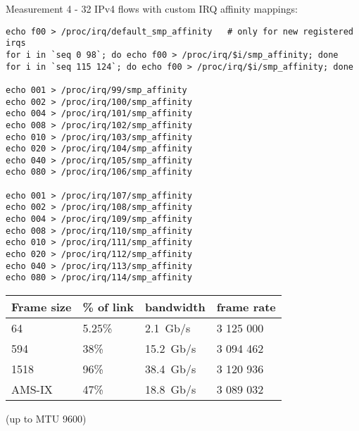 Measurement 4 - 32 IPv4 flows with custom IRQ affinity mappings:
\begin{lstlisting}
echo f00 > /proc/irq/default_smp_affinity   # only for new registered irqs
for i in `seq 0 98`; do echo f00 > /proc/irq/$i/smp_affinity; done
for i in `seq 115 124`; do echo f00 > /proc/irq/$i/smp_affinity; done

echo 001 > /proc/irq/99/smp_affinity
echo 002 > /proc/irq/100/smp_affinity
echo 004 > /proc/irq/101/smp_affinity
echo 008 > /proc/irq/102/smp_affinity
echo 010 > /proc/irq/103/smp_affinity
echo 020 > /proc/irq/104/smp_affinity
echo 040 > /proc/irq/105/smp_affinity
echo 080 > /proc/irq/106/smp_affinity

echo 001 > /proc/irq/107/smp_affinity
echo 002 > /proc/irq/108/smp_affinity
echo 004 > /proc/irq/109/smp_affinity
echo 008 > /proc/irq/110/smp_affinity
echo 010 > /proc/irq/111/smp_affinity
echo 020 > /proc/irq/112/smp_affinity
echo 040 > /proc/irq/113/smp_affinity
echo 080 > /proc/irq/114/smp_affinity
\end{lstlisting}

\begin{tabular}{ | l | l | l | l |}
\hline
Frame size & \% of link & bandwidth & frame rate \\
\hline
64     & 5.25\% & 2.1~Gb/s  & 3 125 000 \\ %
594    & 38\%   & 15.2~Gb/s & 3 094 462 \\ %
1518   & 96\%   & 38.4~Gb/s & 3 120 936 \\ %
AMS-IX & 47\%   & 18.8~Gb/s & 3 089 032 \\ %
\hline
\end{tabular}

(up to MTU 9600)

